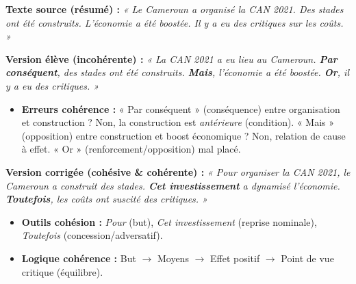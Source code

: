 \documentclass[11pt]{article}
\begin{document}
\begin{exemplebox}
\textbf{Texte source (résumé) :} \emph{« Le Cameroun a organisé la CAN 2021. Des stades ont été construits. L'économie a été boostée. Il y a eu des critiques sur les coûts. »}

\textbf{Version élève (incohérente) :} \emph{« La CAN 2021 a eu lieu au Cameroun. \textbf{Par conséquent}, des stades ont été construits. \textbf{Mais}, l'économie a été boostée. \textbf{Or}, il y a eu des critiques. »}
\begin{itemize}
    \item \textbf{Erreurs cohérence :} « Par conséquent » (conséquence) entre organisation et construction ? Non, la construction est \emph{antérieure} (condition). « Mais » (opposition) entre construction et boost économique ? Non, relation de cause à effet. « Or » (renforcement/opposition) mal placé.
\end{itemize}

\textbf{Version corrigée (cohésive \& cohérente) :} \emph{« Pour organiser la CAN 2021, le Cameroun a construit des stades. \textbf{Cet investissement} a dynamisé l'économie. \textbf{Toutefois}, les coûts ont suscité des critiques. »}
\begin{itemize}
    \item \textbf{Outils cohésion :} \emph{Pour} (but), \emph{Cet investissement} (reprise nominale), \emph{Toutefois} (concession/adversatif).
    \item \textbf{Logique cohérence :} But $\to$ Moyens $\to$ Effet positif $\to$ Point de vue critique (équilibre).
\end{itemize}
\end{exemplebox}
\end{document}
